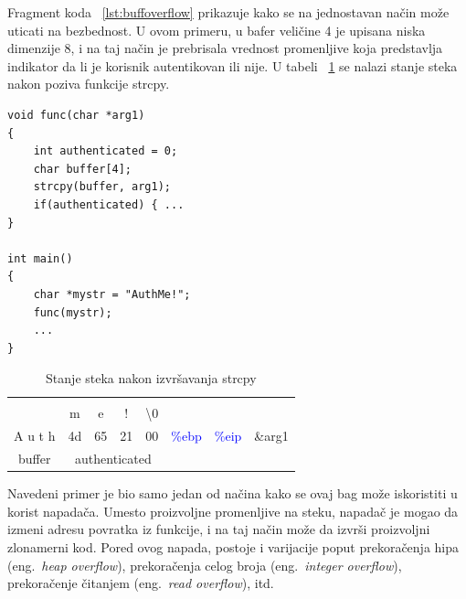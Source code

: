 \documentclass[a4paper]{article}
\begin{document}
Fragment koda ~\ref{lst:buffoverflow} prikazuje kako se na jednostavan način može uticati na bezbednost. U ovom primeru, u bafer veličine 4 je upisana niska dimenzije 8, i na taj način je prebrisala vrednost promenljive koja predstavlja indikator da li je korisnik autentikovan ili nije. U tabeli ~\ref{tab:stack} se nalazi stanje steka nakon poziva funkcije strcpy.
\begin{lstlisting}[title={Primer prekoračenja bafera},label={lst:buffoverflow}]
void func(char *arg1)
{
	int authenticated = 0;
	char buffer[4];
	strcpy(buffer, arg1);
	if(authenticated) { ...
}

int main()
{
	char *mystr = "AuthMe!";
	func(mystr);
	...
}
\end{lstlisting}



\begin{table}[h!]
\begin{center}
\caption{Stanje steka nakon izvršavanja strcpy}
\begin{tabular}{|c|c|c|c|c|c|c|c|}
 \multicolumn{8}{c}{}\\
 \multicolumn{1}{c}{} & \multicolumn{1}{c}{m} & \multicolumn{1}{c}{e} & \multicolumn{1}{c}{!} & \multicolumn{1}{c}{\textbackslash0} & \multicolumn{3}{c}{}\\ \hline
A u t h & 4d & 65 & 21 & 00 & \textcolor{blue}{\%ebp} & \textcolor{blue}{\%eip} & \&arg1\\ \hline
 \multicolumn{1}{c}{buffer} & \multicolumn{4}{c}{authenticated} & \multicolumn{3}{c}{}\\
\end{tabular}
\label{tab:stack}
\end{center}
\end{table}

Navedeni primer je bio samo jedan od načina kako se ovaj bag može iskoristiti u korist napadača. Umesto proizvoljne promenljive na steku, napadač je mogao da izmeni adresu povratka iz funkcije, i na taj način može da izvrši proizvoljni zlonamerni kod. Pored ovog napada, postoje i varijacije poput prekoračenja hipa (eng.~{\em heap overflow}), prekoračenja celog broja (eng.~{\em integer overflow}), prekoračenje čitanjem (eng.~{\em read overflow}), itd.
\end{document}
